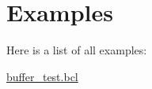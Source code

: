 \section{Examples}
Here is a list of all examples\+:\begin{DoxyCompactItemize}
\item 
\hyperlink{buffer_test_8bcl-example}{buffer\+\_\+test.\+bcl}
\end{DoxyCompactItemize}
